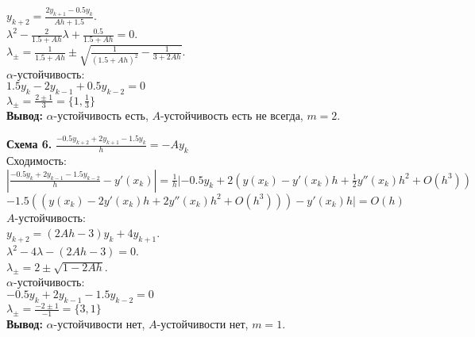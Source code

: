 \documentclass[14pt,a4paper]{extarticle}
\newcommand{\1}{\mathbbm{1}}
\begin{document}
$y_{k+2} = \frac{2 y_{k+1} - 0.5 y_{k}}{A h + 1.5} $.\\
$\lambda^2 - \frac{2}{1.5 + Ah} \lambda + \frac{0.5}{1.5 + Ah} = 0$.\\
$\lambda_{\pm} = \frac{1}{1.5 + Ah} \pm \sqrt{\frac{1}{(1.5 + Ah)^2} - \frac{1}{3 + 2 Ah} }$. \\
$\alpha$-устойчивость:\\ 
$1.5 y_k-2 y_{k-1}+0.5 y_{k-2} = 0$ \\ 
$\lambda_{\pm} = \frac{2 \pm 1}{3} = \{1, \frac{1}{3}\}$ \\ 
\textbf{Вывод:} $\alpha$-устойчивость есть, $A$-устойчивость есть не всегда, $m=2$.
\par
\textbf{Схема 6.} $\frac{-0.5 y_{k+2}+2 y_{k+1}-1.5 y_k}{h}= -A y_k$ \\ 
Сходимость:\\
$|\frac{-0.5 y_k + 2 y_{k-1} - 1.5 y_{k-2}}{h} -y'(x_k)| = \frac{1}{h} |-0.5 y_k+2(y(x_k) - y'(x_k)h +\frac{1}{2} y''(x_k)h^2 + O(h^3))$
$-1.5 ((y(x_k) - 2 y'(x_k)h +2 y''(x_k)h^2 + O(h^3))) -y'(x_k) h| = O(h)$\\
$A$-устойчивость:\\ 
$y_{k+2} = (2 A h - 3) y_k + 4 y_{k+1}$.\\
$\lambda^2  - 4 \lambda - (2 A h - 3) = 0$.\\
$\lambda_{\pm} = 2 \pm \sqrt{1 - 2 A h}$.\\
$\alpha$-устойчивость:\\ 
$-0.5 y_k+2 y_{k-1}-1.5 y_{k-2} = 0$ \\ 
$\lambda_{\pm} = \frac{-2 \pm 1}{-1} = \{3, 1\}$ \\ 
\textbf{Вывод:} $\alpha$-устойчивости нет, $A$-устойчивости нет, $m=1$.
\end{document}
